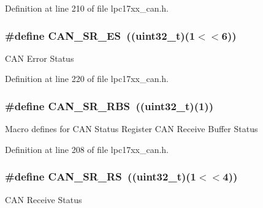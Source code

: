 \-Definition at line 210 of file lpc17xx\-\_\-can.\-h.

\hypertarget{group___c_a_n___private___macros_ga1c3462f50fe57e646b5bd83cf4929754}{
\subsubsection[{\-C\-A\-N\-\_\-\-S\-R\-\_\-\-E\-S}]{\setlength{\rightskip}{0pt plus 5cm}\#define {\bf \-C\-A\-N\-\_\-\-S\-R\-\_\-\-E\-S}~((uint32\-\_\-t)(1$<$$<$6))}}\label{group___c_a_n___private___macros_ga1c3462f50fe57e646b5bd83cf4929754}
\-C\-A\-N \-Error \-Status 

\-Definition at line 220 of file lpc17xx\-\_\-can.\-h.

\hypertarget{group___c_a_n___private___macros_ga3f76c8eae3d8555fa55a3c3fa61a58f5}{
\subsubsection[{\-C\-A\-N\-\_\-\-S\-R\-\_\-\-R\-B\-S}]{\setlength{\rightskip}{0pt plus 5cm}\#define {\bf \-C\-A\-N\-\_\-\-S\-R\-\_\-\-R\-B\-S}~((uint32\-\_\-t)(1))}}\label{group___c_a_n___private___macros_ga3f76c8eae3d8555fa55a3c3fa61a58f5}
\-Macro defines for \-C\-A\-N \-Status \-Register \-C\-A\-N \-Receive \-Buffer \-Status 

\-Definition at line 208 of file lpc17xx\-\_\-can.\-h.

\hypertarget{group___c_a_n___private___macros_ga04ff66218ff23feed6e187aabf9491ae}{
\subsubsection[{\-C\-A\-N\-\_\-\-S\-R\-\_\-\-R\-S}]{\setlength{\rightskip}{0pt plus 5cm}\#define {\bf \-C\-A\-N\-\_\-\-S\-R\-\_\-\-R\-S}~((uint32\-\_\-t)(1$<$$<$4))}}\label{group___c_a_n___private___macros_ga04ff66218ff23feed6e187aabf9491ae}
\-C\-A\-N \-Receive \-Status 

